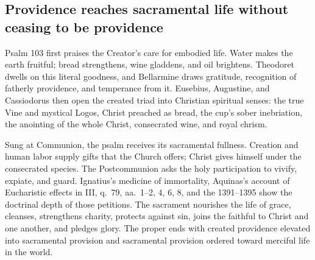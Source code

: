 \subsection*{Providence reaches sacramental life without ceasing to be providence}

Psalm 103 first praises the Creator's care for embodied life. Water makes the
earth fruitful; bread strengthens, wine gladdens, and oil brightens. Theodoret
dwells on this literal goodness, and Bellarmine draws gratitude, recognition of
fatherly providence, and temperance from it. Eusebius, Augustine, and Cassiodorus then open the
created triad into Christian spiritual senses: the true Vine and mystical
Logos, Christ preached as bread, the cup's sober inebriation, the anointing of
the whole Christ, consecrated wine, and royal chrism.

Sung at Communion, the psalm receives its sacramental fullness. Creation and
human labor supply gifts that the Church offers; Christ gives himself under
the consecrated species. The Postcommunion asks the holy participation to
vivify, expiate, and guard. Ignatius's medicine of immortality, Aquinas's
account of Eucharistic effects in  III, q.~79, aa.~1--2, 4, 6, 8,
and the  1391--1395 show the
doctrinal depth of those petitions. The sacrament nourishes the life of grace,
cleanses, strengthens charity, protects against sin, joins the faithful to
Christ and one another, and pledges glory. The proper ends with created
providence elevated into sacramental provision and sacramental provision
ordered toward merciful life in the world.
